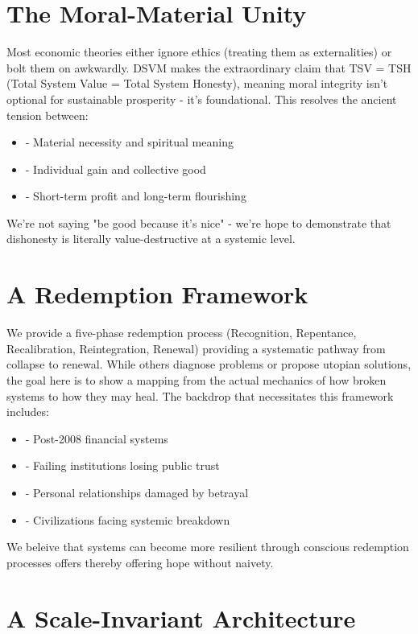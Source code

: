 \documentclass[11pt,oneside]{book}
\begin{document}
\section{The Moral-Material Unity}

Most economic theories either ignore ethics (treating them as externalities) or bolt them on awkwardly. DSVM makes the extraordinary claim that TSV = TSH (Total System Value = Total System Honesty), meaning moral integrity isn't optional for sustainable prosperity - it's foundational. This resolves the ancient tension between:

\begin{itemize}
\item - Material necessity and spiritual meaning
\item - Individual gain and collective good
\item - Short-term profit and long-term flourishing
\end{itemize}

We're not saying "be good because it's nice" - we're hope to demonstrate that dishonesty is literally value-destructive at a systemic level.

\section{A Redemption Framework}

We provide a five-phase redemption process (Recognition, Repentance, Recalibration, Reintegration, Renewal) providing a systematic pathway from collapse to renewal.  While others diagnose problems or propose utopian solutions, the goal here is to show a mapping from the actual mechanics of how broken systems to how they may heal. The backdrop that necessitates this framework includes:

\begin{itemize}
\item - Post-2008 financial systems
\item - Failing institutions losing public trust
\item - Personal relationships damaged by betrayal
\item - Civilizations facing systemic breakdown
\end{itemize}

We beleive that systems can become more resilient through conscious redemption processes offers thereby offering hope without naivety.

\section{A Scale-Invariant Architecture}
\end{document}
